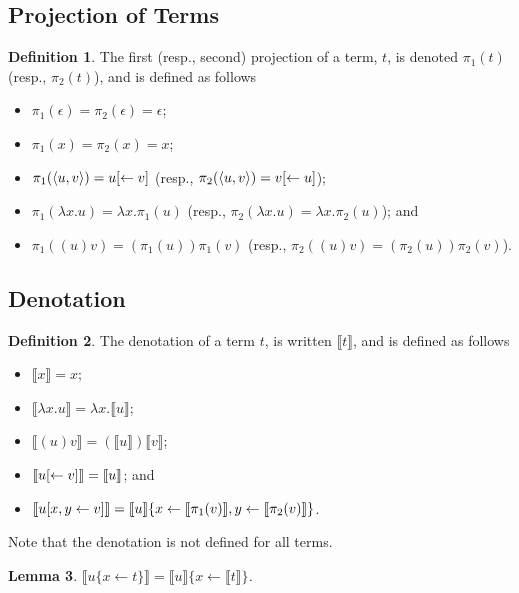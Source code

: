 \documentclass[11pt,a4paper]{article}
\theoremstyle{definition}
\newtheorem{definition}{Definition}
\theoremstyle{plain}
\newtheorem{lemma}[definition]{Lemma}
\theoremstyle{remark}
\begin{document}
\subsection{Projection of Terms}

\begin{definition}
	The first (resp., second) projection of a term, $t$, is denoted $\pi_1(t)$ (resp., $\pi_2(t)$), and is defined as follows
	\begin{itemize}
		\item $\pi_1(\epsilon)=\pi_2(\epsilon)=\epsilon$;
		\item $\pi_1(x)=\pi_2(x)=x$;
		\item $\pi_1({\langle{u},{v}\rangle})=u{[\leftarrow{v}]}$ (resp., $\pi_2({\langle{u},{v}\rangle})=v{[\leftarrow{u}]}$);
		\item $\pi_1(\lambda x.u)=\lambda x.\pi_1(u)$ (resp., $\pi_2(\lambda x.u)=\lambda x.\pi_2(u)$); and
		\item $\pi_1( (u)v)=(\pi_1(u))\pi_1(v)$ (resp., $\pi_2( (u)v)=(\pi_2(u))\pi_2(v)$).
	\end{itemize}
\end{definition}

\subsection{Denotation}

\newcommand{\terden}[1]{{\llbracket{#1}\rrbracket}}

\begin{definition}
	The denotation of a term $t$, is written $\terden{t}$, and is defined as follows
	\begin{itemize}
		\item $\terden{x}=x$;
		\item $\terden{\lambda x. u}=\lambda x.\terden{u}$;
		\item $\terden{(u)v}=(\terden{u})\terden{v}$;
		\item $\terden{u\terdel{v}}=\terden{u}$; and
		\item $\terden{u\terdup{x}{y}{v}}=\terden{u}\{x\leftarrow \terden{\pi_1(v)},y\leftarrow\terden{\pi_2(v)}\}$.
\end{itemize}
\end{definition}

Note that the denotation is not defined for all terms.

\begin{lemma}
	$\terden{u\{x\leftarrow t\}}=\terden{u}\{x\leftarrow\terden{t}\}$.
\end{lemma}
\end{document}
